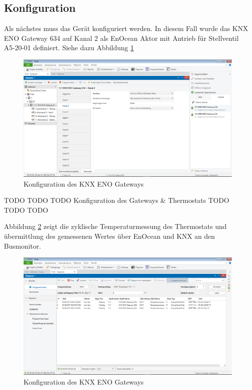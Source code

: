 \documentclass[a4paper]{article}
\begin{document}
\subsection{Konfiguration}

Als nächstes muss das Gerät konfiguriert werden. In diesem Fall wurde das KNX ENO Gateway 634 auf Kanal 2 als EnOcean Aktor mit Antrieb für Stellventil A5-20-01 definiert. Siehe dazu Abbildung \ref{fig:11}

\begin{figure}[h!]
	\centering
	\includegraphics[width=13cm]{Doku/11}
	\caption{Konfiguration des KNX ENO Gateways}
	\label{fig:11}
\end{figure}

TODO TODO TODO Konfiguration des Gateways \& Thermostats TODO TODO TODO

Abbildung \ref{fig:12} zeigt die zyklische Temperaturmessung des Thermostats und übermittlung des gemessenen Wertes über EnOcean und KNX an den Busmonitor.

\begin{figure}[h!]
	\centering
	\includegraphics[width=13cm]{Doku/12}
	\caption{Konfiguration des KNX ENO Gateways}
	\label{fig:12}
\end{figure}
\end{document}
